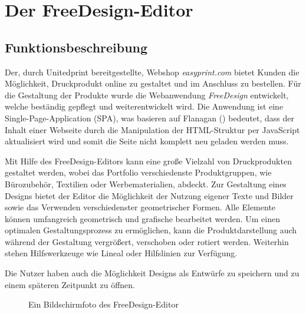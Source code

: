 \section{Der FreeDesign-Editor}
\label{Der FreeDesign-Editor}
\subsection{Funktionsbeschreibung}
Der, durch Unitedprint bereitgestellte, Webshop \emph{easyprint.com} bietet Kunden die Möglichkeit, Druckprodukt online zu gestaltet und im Anschluss zu bestellen. Für die Gestaltung der Produkte wurde die Webanwendung \emph{FreeDesign} entwickelt, welche beständig gepflegt und weiterentwickelt wird. Die Anwendung ist eine Single-Page-Application (SPA), was basieren auf Flanagan (\citeyear[S. 497]{Flanagan2006}) bedeutet, dass der Inhalt einer Webseite durch die Manipulation der HTML-Struktur per JavaScript aktualisiert wird und somit die Seite nicht komplett neu geladen werden muss. 

Mit Hilfe des FreeDesign-Editors kann eine große Vielzahl von Druckprodukten gestaltet werden, wobei das Portfolio verschiedenste Produktgruppen, wie Bürozubehör, Textilien oder Werbematerialien, abdeckt. Zur Gestaltung eines Designs bietet der Editor die Möglichkeit der Nutzung eigener Texte und Bilder sowie das Verwenden verschiedenster geometrischer Formen. Alle Elemente können umfangreich geometrisch und grafische bearbeitet werden. Um einen optimalen Gestaltungsprozess zu ermöglichen, kann die Produktdarstellung auch während der Gestaltung vergrößert, verschoben oder rotiert werden. Weiterhin stehen Hilfswerkzeuge wie Lineal oder Hilfslinien zur Verfügung. 

Die Nutzer haben auch die Möglichkeit Designs als Entwürfe zu speichern und zu einem späteren Zeitpunkt zu öffnen.

\begin{figure}[H]
    \centering
    \caption{Ein Bildschirmfoto des FreeDesign-Editor}
    \label{fig:Der FreeDesign-Editor}
\end{figure}

